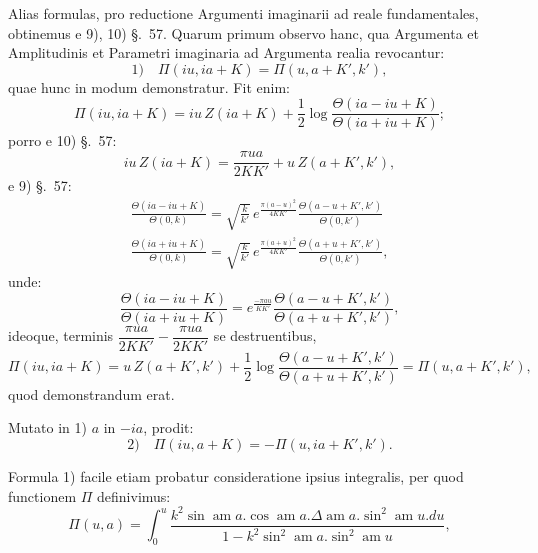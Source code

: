 \documentclass{article}
\begin{document}
Alias formulas, pro reductione Argumenti imaginarii ad reale fundamentales, obtinemus e 9), 10) §.\ 57. Quarum primum observo hanc, qua Argumenta et Amplitudinis et Parametri imaginaria ad Argumenta realia revocantur:
\[
\text{1)}\quad \Pi(iu,ia+K)=\Pi(u,a+K',k'),
\]
quae hunc in modum demonstratur. Fit enim:
\[
\Pi(iu,ia+K)=iu\,Z(ia+K)+\frac{1}{2}\log\frac{\Theta(ia-iu+K)}{\Theta(ia+iu+K)};
\]
porro e 10) §.\ 57:
\[
iu\,Z(ia+K)=\frac{\pi ua}{2KK'}+u\,Z(a+K',k'),
\]
e 9) §.\ 57:
\[
\begin{gathered}
\frac{\Theta(ia-iu+K)}{\Theta(0,k)}=\sqrt{\frac{k}{k'}}\,e^{\frac{\pi(a-u)^{2}}{4KK'}}\frac{\Theta(a-u+K',k')}{\Theta(0,k')}\\[1.5ex]
\frac{\Theta(ia+iu+K)}{\Theta(0,k)}=\sqrt{\frac{k}{k'}}\,e^{\frac{\pi(a+u)^{2}}{4KK'}}\frac{\Theta(a+u+K',k')}{\Theta(0,k')},
\end{gathered}
\]
unde:
\[
\frac{\Theta(ia-iu+K)}{\Theta(ia+iu+K)}=e^{\frac{-\pi au}{KK'}}\frac{\Theta(a-u+K',k')}{\Theta(a+u+K',k')},
\]
ideoque, terminis $\dfrac{\pi ua}{2KK'}-\dfrac{\pi ua}{2KK'}$ se destruentibus,
\[
\Pi(iu,ia+K)=u\,Z(a+K',k')+\frac{1}{2}\log\frac{\Theta(a-u+K',k')}{\Theta(a+u+K',k')}=\Pi(u,a+K',k'),
\]
quod demonstrandum erat.

Mutato in 1) $a$ in $-ia$, prodit:
\[
\text{2)}\quad \Pi(iu,a+K)=-\Pi(u,ia+K',k').
\]

Formula 1) facile etiam probatur consideratione ipsius integralis, per quod functionem $\Pi$ definivimus:
\[
\Pi(u,a)=\int_{0}^{u}\frac{k^{2}\sin\operatorname{am}a.\cos\operatorname{am}a.\Delta\operatorname{am}a.\sin^{2}\operatorname{am}u.du}{1-k^{2}\sin^{2}\operatorname{am}a.\sin^{2}\operatorname{am}u},
\]
\end{document}
